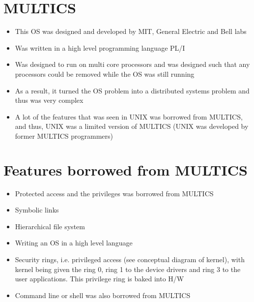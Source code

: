 \documentclass[10pt]{article}
\begin{document}
\section{MULTICS}
\begin{itemize}
\item This OS was designed and developed by MIT, General Electric and Bell labs
\item Was written in a high level programming language PL/I
\item Was designed to run on multi core processors and was designed such that any processors could be removed while the OS was still running
\item As a result, it turned the OS problem into a distributed systems problem and thus was very complex
\item A lot of the features that was seen in UNIX was borrowed from MULTICS, and thus, UNIX was a limited version of MULTICS (UNIX was developed by former MULTICS programmers)

\end{itemize}


\section{Features borrowed from MULTICS}
\begin{itemize}
    \item Protected access and the privileges was borrowed from MULTICS
    \item Symbolic links
    \item Hierarchical file system
    \item Writing an OS in a high level language
    \item Security rings, i.e. privileged access (see conceptual diagram of kernel), with kernel being given the ring 0, ring 1 to the device drivers and ring 3 to the user applications. This privilege ring is baked into H/W
    \item Command line or shell was also borrowed from MULTICS
    
\end{itemize}
\end{document}
